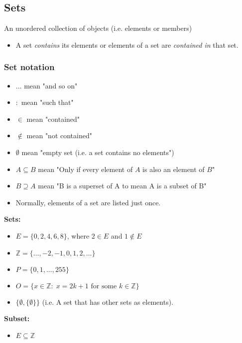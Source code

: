 \subsection{Sets}
\begin{definition}
    An unordered collection of objects (i.e. elements or members)
    \begin{itemize}
        \item A set \emph{contains} its elements or elements of a set are \emph{contained in} that set.
    \end{itemize}
\end{definition}

    \subsubsection{Set notation}
    \begin{terminology}
        \begin{itemize}
            \item $\ldots$ mean "and so on"
            \item $:$ mean "such that"
            \item $\in$ mean "contained"
            \item $\notin$ mean "not contained"
            \item $\emptyset$ mean "empty set (i.e. a set contains no elements")
            \item $A\subseteq B$ mean "Only if every element of $A$ is also an element of $B$"
            \item $B\supseteq A$ mean "B is a superset of A to mean A is a subset of B" 
            \item Normally, elements of a set are listed just once.
        \end{itemize}
    \end{terminology}

\begin{example}

    \textbf{Sets:}
    \begin{itemize}
        \item $E = \{0,2,4,6,8\}$, where $2\in E$ and $1 \notin E$
        \item $\mathbb{Z} = \{\ldots,-2,-1,0,1,2,\ldots\}$
        \item $P=\{0,1,...,255\}$
        \item $O = \{x \in \mathbb{Z}: \; x=2k+1 \text{ for some } k \in \mathbb{Z}\}$
        \item $\{\emptyset,\{\emptyset\}\}$ (i.e. A set that has other sets as elements).
    \end{itemize}
    \vspace{1em}

    \textbf{Subset:}
    \begin{itemize}
        \item $E \subseteq \mathbb{Z}$
    \end{itemize}
\end{example}

